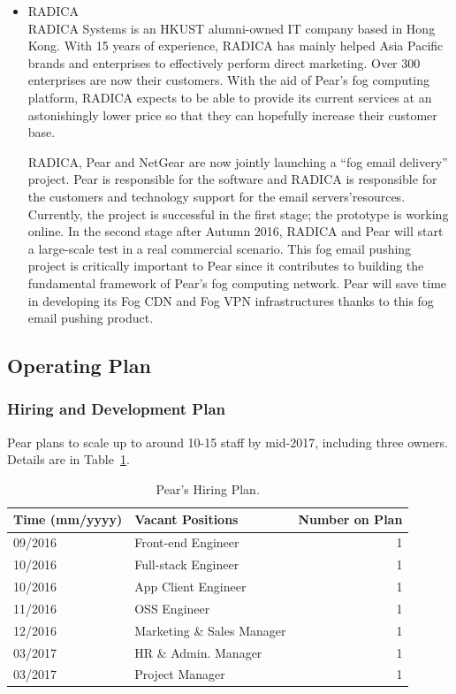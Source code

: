 \begin{itemize}
	\item RADICA\\
	RADICA Systems is an HKUST alumni-owned IT company based in Hong Kong. With 15 years of experience, RADICA has mainly helped Asia Pacific brands and enterprises to effectively perform direct marketing. Over 300 enterprises are now their customers. With the aid of Pear's fog computing platform, RADICA expects to be able to provide its current services at an astonishingly lower price so that they can hopefully increase their customer base.
	
	RADICA, Pear and NetGear are now jointly launching a ``fog email delivery'' project. Pear is responsible for the software and RADICA is responsible for the customers and technology support for the email servers'resources. Currently, the project is successful in the first stage; the prototype is working online. In the second stage after Autumn 2016, RADICA and Pear will start a large-scale test in a real commercial scenario. This fog email pushing project is critically important to Pear since it contributes to building the fundamental framework of Pear's fog computing network. Pear will save time in developing its Fog CDN and Fog VPN infrastructures thanks to this fog email pushing product. 
\end{itemize}

\subsection{Operating Plan}
\subsubsection{Hiring and Development Plan}
Pear plans to scale up to around 10-15 staff by mid-2017, including three owners. Details are in Table~\ref{tb:hiring-plan}. 
\begin{table}[ht]
	\centering
	\caption{Pear's Hiring Plan.}\label{tb:hiring-plan}
	\begin{tabular}[t]{llr}  
		\toprule
		Time (mm/yyyy) & Vacant Positions & Number on Plan\\
		\midrule
		09/2016    & Front-end Engineer &    1\\
		10/2016    & Full-stack Engineer &    1\\
		10/2016    & App Client Engineer &    1\\
		11/2016    & OSS Engineer &    1\\
		12/2016    & Marketing \& Sales Manager &    1\\
		03/2017    & HR \& Admin. Manager &    1\\
		03/2017 & Project Manager &    1\\
		\bottomrule
	\end{tabular}
\end{table}

